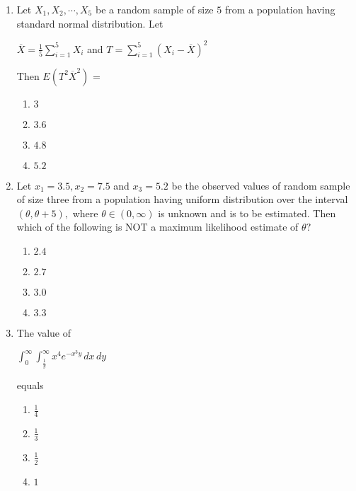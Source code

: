 \documentclass[journal]{IEEEtran}
\theoremstyle{remark}
\begin{document}
\begin{enumerate}
                \item Let $X_1,X_2, \cdots,X_5$ be a random sample of size $5$ from a population having standard normal distribution. Let
                \begin{center}
                    $\overline{X} = \frac{1}{5}\sum_{i=1}^{5} X_i$ and $T = \sum_{i=1}^{5} (X_i-\overline{X})^2$
                \end{center}
                Then $E(T^2\overline{X}^2)$ =
                \begin{multicols}{4}
                \begin{enumerate}
                    \item $3$
                    \item $3.6$
                    \item $4.8$
                    \item $5.2$
                \end{enumerate}
                    
                \end{multicols}

                \item Let $x_1=3.5, x_2=7.5$ and $x_3=5.2$ be the observed values of random sample of size three from a population having uniform distribution over the interval $(\theta,\theta+5),$ where $\theta \in(0,\infty)$ is unknown and is to be estimated. Then which of the following is NOT a maximum likelihood estimate of $\theta ?$
                \begin{multicols}{4}
                \begin{enumerate}
                    \item $2.4$
                    \item $2.7$
                    \item $3.0$
                    \item $3.3$
                \end{enumerate}
                    
                \end{multicols}

                \item The value of 
                \begin{center}
                    $\int_{0}^{\infty} \int_{\frac{1}{y}}^{\infty} x^4 e^{-x^3 y} \, dx \, dy$
                \end{center}
                equals 
                \begin{multicols}{4}
                \begin{enumerate}
                    \item $\frac{1}{4}$
                    \item $\frac{1}{3}$
                     \item $\frac{1}{2}$
                     \item $1$
                \end{enumerate}
                    

\end{multicols}
\end{enumerate}
\end{document}
